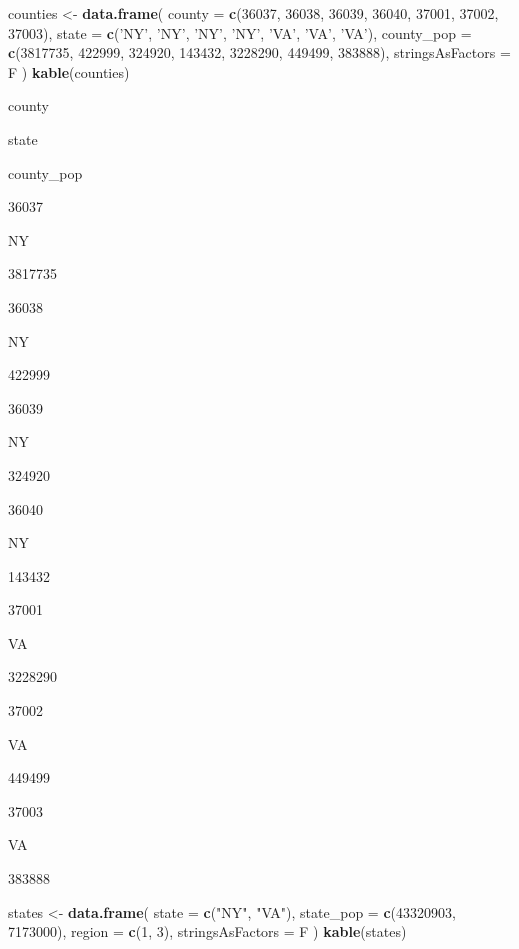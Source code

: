 \documentclass[]{book}
\newenvironment{Shaded}{\begin{snugshade}}{\end{snugshade}}
\newcommand{\DataTypeTok}[1]{\textcolor[rgb]{0.13,0.29,0.53}{#1}}
\newcommand{\DecValTok}[1]{\textcolor[rgb]{0.00,0.00,0.81}{#1}}
\newcommand{\KeywordTok}[1]{\textcolor[rgb]{0.13,0.29,0.53}{\textbf{#1}}}
\newcommand{\NormalTok}[1]{#1}
\newcommand{\StringTok}[1]{\textcolor[rgb]{0.31,0.60,0.02}{#1}}
\begin{document}
\begin{Shaded}
\begin{Highlighting}[]
\NormalTok{counties <-}\StringTok{ }\KeywordTok{data.frame}\NormalTok{(}
  \DataTypeTok{county =} \KeywordTok{c}\NormalTok{(}\DecValTok{36037}\NormalTok{, }\DecValTok{36038}\NormalTok{, }\DecValTok{36039}\NormalTok{, }\DecValTok{36040}\NormalTok{, }\DecValTok{37001}\NormalTok{, }\DecValTok{37002}\NormalTok{, }\DecValTok{37003}\NormalTok{),}
  \DataTypeTok{state =} \KeywordTok{c}\NormalTok{(}\StringTok{'NY'}\NormalTok{, }\StringTok{'NY'}\NormalTok{, }\StringTok{'NY'}\NormalTok{, }\StringTok{'NY'}\NormalTok{, }\StringTok{'VA'}\NormalTok{, }\StringTok{'VA'}\NormalTok{, }\StringTok{'VA'}\NormalTok{),}
  \DataTypeTok{county_pop =} \KeywordTok{c}\NormalTok{(}\DecValTok{3817735}\NormalTok{, }\DecValTok{422999}\NormalTok{, }\DecValTok{324920}\NormalTok{, }\DecValTok{143432}\NormalTok{, }\DecValTok{3228290}\NormalTok{, }\DecValTok{449499}\NormalTok{, }\DecValTok{383888}\NormalTok{), }\DataTypeTok{stringsAsFactors =}\NormalTok{ F}
\NormalTok{)}
\KeywordTok{kable}\NormalTok{(counties)}
\end{Highlighting}
\end{Shaded}

county

state

county\_pop

36037

NY

3817735

36038

NY

422999

36039

NY

324920

36040

NY

143432

37001

VA

3228290

37002

VA

449499

37003

VA

383888

\begin{Shaded}
\begin{Highlighting}[]

\NormalTok{states <-}\StringTok{ }\KeywordTok{data.frame}\NormalTok{(}
  \DataTypeTok{state =} \KeywordTok{c}\NormalTok{(}\StringTok{"NY"}\NormalTok{, }\StringTok{"VA"}\NormalTok{),}
  \DataTypeTok{state_pop =} \KeywordTok{c}\NormalTok{(}\DecValTok{43320903}\NormalTok{, }\DecValTok{7173000}\NormalTok{),}
  \DataTypeTok{region =} \KeywordTok{c}\NormalTok{(}\DecValTok{1}\NormalTok{, }\DecValTok{3}\NormalTok{), }\DataTypeTok{stringsAsFactors =}\NormalTok{ F}
\NormalTok{)}
\KeywordTok{kable}\NormalTok{(states)}
\end{Highlighting}
\end{Shaded}
\end{document}
